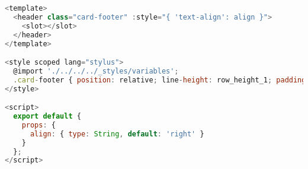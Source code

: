 \begin{lstlisting}[language=JavaScript]
<template>
  <header class="card-footer" :style="{ 'text-align': align }">
    <slot></slot>
  </header>
</template>

<style scoped lang="stylus">
  @import './../../../_styles/variables';
  .card-footer { position: relative; line-height: row_height_1; padding: 2px 0 5px; border-top: 1px solid light_gray_1; margin-top: 10px; }
</style>

<script>
  export default {
    props: {
      align: { type: String, default: 'right' }
    }
  };
</script>
\end{lstlisting}



\begin{lstlisting}[language=JavaScript]

\end{lstlisting}



\begin{lstlisting}[language=JavaScript]

\end{lstlisting}




\begin{lstlisting}[language=JavaScript]

\end{lstlisting}



\begin{lstlisting}[language=JavaScript]

\end{lstlisting}



\begin{lstlisting}[language=JavaScript]

\end{lstlisting}




\begin{lstlisting}[language=JavaScript]

\end{lstlisting}



\begin{lstlisting}[language=JavaScript]

\end{lstlisting}



\begin{lstlisting}[language=JavaScript]

\end{lstlisting}



